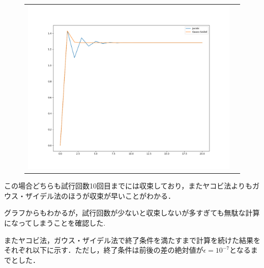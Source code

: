 \documentclass[a4paper, titlepage]{jsarticle}
\begin{document}
			\begin{figure}[ht]
				\begin{tabular}{cc}
					\begin{minipage}[t]{10cm}
						\centering
						\includegraphics[keepaspectratio, scale=0.5]{compareX.png}
					\end{minipage}
				\end{tabular}
			\end{figure}

	この場合どちらも試行回数10回目までには収束しており，またヤコビ法よりもガウス・ザイデル法のほうが収束が早いことがわかる．

	グラフからもわかるが，試行回数が少ないと収束しないが多すぎても無駄な計算になってしまうことを確認した.

	またヤコビ法，ガウス・ザイデル法で終了条件を満たすまで計算を続けた結果をそれぞれ以下に示す．ただし，終了条件は前後の差の絶対値が${\epsilon = 10^{-7}}$となるまでとした．
\end{document}
